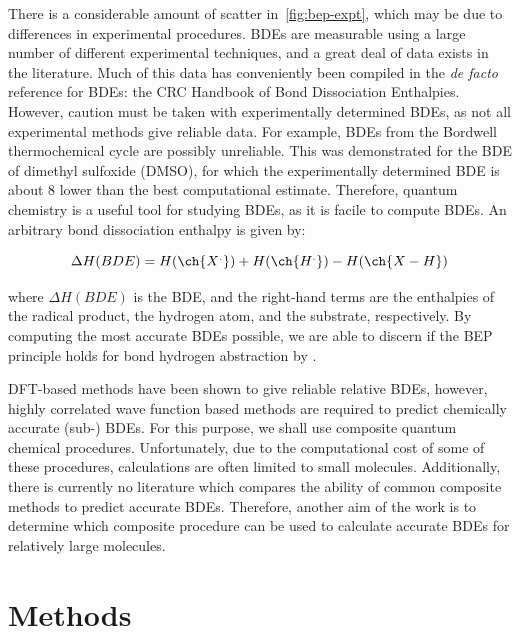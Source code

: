 There is a considerable amount of scatter in~\ref{fig:bep-expt}, which may be due to differences in experimental procedures. BDEs are measurable using a large number of different experimental techniques, and a great deal of data exists in the literature. Much of this data has conveniently been compiled in the \emph{de facto} reference for BDEs: the CRC Handbook of Bond Dissociation Enthalpies.\cite{Luo2002} However, caution must be taken with experimentally determined BDEs, as not all experimental methods give reliable data. For example, BDEs from the Bordwell\cite{Bordwell1988} thermochemical cycle are possibly unreliable.\cite{Salamone2012, Miller2016} This was demonstrated for the BDE of dimethyl sulfoxide (DMSO), for which the experimentally determined BDE is about 8 \kcalmol lower than the best computational estimate.\cite{Salamone2012} Therefore, quantum chemistry is a useful tool for studying BDEs, as it is facile to compute BDEs. An arbitrary  bond dissociation enthalpy is given by:

\begin{equation}
  \Delta H(BDE) =  H(\ch{X^.}) + H(\ch{H^.}) - H(\ch{X-H})
\end{equation}

\noindent where $\Delta H(BDE)$ is the BDE, and the right-hand terms are the enthalpies of the radical product, the hydrogen atom, and the substrate, respectively. By computing the most accurate BDEs possible, we are able to discern if the BEP principle holds for  bond hydrogen abstraction by \cumo.

DFT-based methods have been shown to give reliable relative BDEs, however, highly correlated wave function based methods are required to predict chemically accurate (sub-\kcalmol) BDEs.\cite{DiLabio1999, Chan2012, Wiberg2014} For this purpose, we shall use composite quantum chemical procedures. Unfortunately, due to the computational cost of some of these procedures, calculations are often limited to small molecules. Additionally, there is currently no literature which compares the ability of common composite methods to predict accurate BDEs. Therefore, another aim of the work is to determine which composite procedure can be used to calculate accurate BDEs for relatively large molecules.

\section{Methods}

